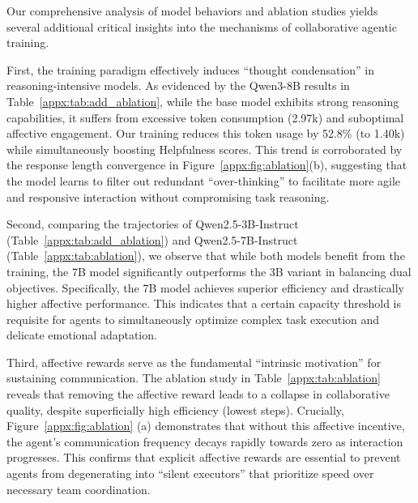 \documentclass{article}
\theoremstyle{plain}
\theoremstyle{definition}
\theoremstyle{remark}
\begin{document}
Our comprehensive analysis of model behaviors and ablation studies yields several additional critical insights into the mechanisms of collaborative agentic training.

First, the training paradigm effectively induces ``thought condensation'' in reasoning-intensive models. As evidenced by the Qwen3-8B results in Table~\ref{appx:tab:add_ablation}, while the base model exhibits strong reasoning capabilities, it suffers from excessive token consumption (2.97k) and suboptimal affective engagement. Our training reduces this token usage by 52.8\% (to 1.40k) while simultaneously boosting Helpfulness scores. This trend is corroborated by the response length convergence in Figure~\ref{appx:fig:ablation}(b), suggesting that the model learns to filter out redundant ``over-thinking'' to facilitate more agile and responsive interaction without compromising task reasoning.

Second, comparing the trajectories of Qwen2.5-3B-Instruct (Table~\ref{appx:tab:add_ablation}) and Qwen2.5-7B-Instruct (Table~\ref{appx:tab:ablation}), we observe that while both models benefit from the training, the 7B model significantly outperforms the 3B variant in balancing dual objectives. Specifically, the 7B model achieves superior efficiency and drastically higher affective performance. This indicates that a certain capacity threshold is requisite for agents to simultaneously optimize complex task execution and delicate emotional adaptation.

Third, affective rewards serve as the fundamental ``intrinsic motivation'' for sustaining communication. The ablation study in Table~\ref{appx:tab:ablation} reveals that removing the affective reward leads to a collapse in collaborative quality, despite superficially high efficiency (lowest steps). Crucially, Figure~\ref{appx:fig:ablation} (a) demonstrates that without this affective incentive, the agent's communication frequency decays rapidly towards zero as interaction progresses. This confirms that explicit affective rewards are essential to prevent agents from degenerating into ``silent executors'' that prioritize speed over necessary team coordination.
\end{document}

